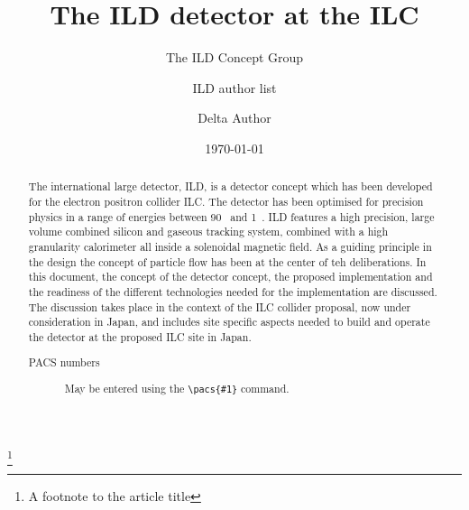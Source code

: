 \documentclass[%
 preprint,
 amsmath,amssymb,
 aps,
]{revtex4-1}
\begin{document}

\title{The ILD detector at the ILC}%
\thanks{A footnote to the article title}%

\author{The ILD Concept Group}
%


\author{ILD author list}
%
%
\author{Delta Author}
%


\date{\today}%

\begin{abstract}
The international large detector, ILD, is a detector concept which has been developed for the electron positron collider ILC. The detector has been optimised for precision physics in a range of energies between 90 ~\GeV and 1~\TeV. ILD features a high precision, large volume combined silicon and gaseous tracking system, combined with a high granularity calorimeter all inside a solenoidal magnetic field. As a guiding principle in the design the concept of particle flow has been at the center of teh deliberations. In this document, the concept of the detector concept, the proposed implementation and the readiness of the different technologies needed for the implementation are discussed. The discussion takes place in the context of the ILC collider proposal, now under consideration in Japan, and includes site specific aspects needed to build and operate the detector at the proposed ILC site in Japan. 
\begin{description}
\item[PACS numbers]
May be entered using the \verb+\pacs{#1}+ command.
\end{description}
\end{abstract}
\end{document}
